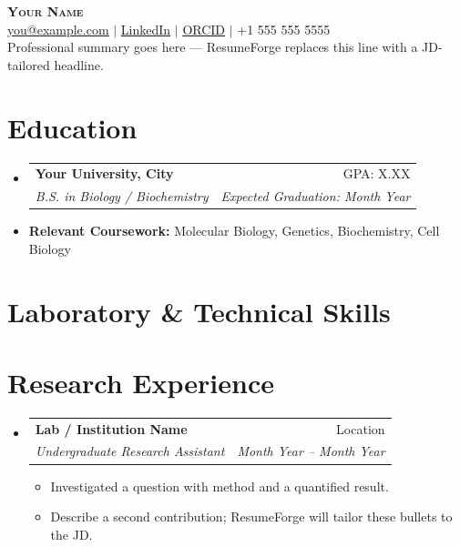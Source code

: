 \documentclass[letterpaper,10pt]{article}
\makeatletter
\newcommand{\resumeItem}[1]{
  \item{\small\setlength{\baselineskip}{10pt} #1 \vspace{-2pt}}
}
\newcommand{\resumeSubheading}[4]{
  \vspace{-2pt}\item
    \begin{tabular*}{\textwidth}[t]{@{}p{0.75\textwidth}@{\extracolsep{\fill}}r@{}}
      \textbf{#1} & \small #2 \\
      \textit{\small#3} & \textit{\small #4} \\
    \end{tabular*}\vspace{-4pt}
}
\newcommand{\resumeSubHeadingListStart}{\begin{itemize}[leftmargin=0in, label={}, topsep=0pt, partopsep=0pt]}
\newcommand{\resumeSubHeadingListEnd}{\end{itemize}}
\newcommand{\resumeItemListStart}{\begin{itemize}[leftmargin=0.15in, label={$\bullet$}, topsep=0pt, partopsep=0pt, itemsep=3pt, parsep=0pt]}
\newcommand{\resumeItemListEnd}{\end{itemize}}
\makeatother
\begin{document}
\fontsize{10.5}{11}\selectfont
\begin{center}
    {\Huge \scshape \textbf{Your Name}} \\ \vspace{4pt}
    \href{mailto:you@example.com}{\ul{you@example.com}} $|$
    \href{https://www.linkedin.com/in/your-handle/}{\ul{LinkedIn}} $|$
    \href{https://orcid.org/0000-0000-0000-0000}{\ul{ORCID}} $|$
    +1 555 555 5555
    \\ \vspace{6pt}
    {Professional summary goes here — ResumeForge replaces this line with a JD-tailored headline.}
\end{center}
\section{Education}
\resumeSubHeadingListStart
  \resumeSubheading
    {Your University, City}{GPA: X.XX}
    {B.S. in Biology / Biochemistry}{\textit{Expected Graduation: Month Year}}  \vspace{-9pt}
  \item \small{\textbf{Relevant Coursework:} Molecular Biology, Genetics, Biochemistry, Cell Biology}
\resumeSubHeadingListEnd
\section{Laboratory \& Technical Skills}
\begin{itemize}[leftmargin=0in, label={}, topsep=0pt, partopsep=0pt]
  \small{\item{
  }}
\end{itemize}
\section{Research Experience}
\resumeSubHeadingListStart
  \resumeSubheading
    {Lab / Institution Name}{Location}
    {Undergraduate Research Assistant}{Month Year -- Month Year}
    \resumeItemListStart
      \resumeItem{Investigated a question with method and a quantified result.}
      \resumeItem{Describe a second contribution; ResumeForge will tailor these bullets to the JD.}
    \resumeItemListEnd
\resumeSubHeadingListEnd
\end{document}
